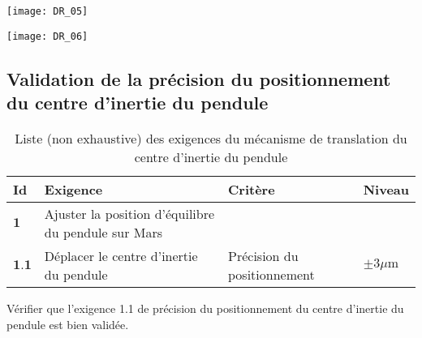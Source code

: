 \ifprof
\else
\begin{minipage}{.48\linewidth}
\begin{center}
\centering
\texttt{[image: DR\_05]}
\end{center}

\end{minipage}
\begin{minipage}{.48\linewidth}
\begin{center}
\centering
\texttt{[image: DR\_06]}
\end{center}
\end{minipage}
\subsection{Validation de la précision du positionnement du centre d'inertie du pendule}

\begin{table}[!h]
\centering
\begin{tabular}{llll}
\hline
Id & Exigence & Critère & Niveau \\
\hline
$\mathbf{1}$ & Ajuster la position d'équilibre du pendule sur Mars &  &  \\
\hline
$\mathbf{1 . 1}$ & Déplacer le centre d'inertie du pendule & Précision du positionnement & $\pm 3 \mu \mathrm{m}$ \\
\hline
\end{tabular}
\caption{\label{ccmp2023_tab_01} Liste (non exhaustive) des exigences du mécanisme de translation du centre d'inertie du pendule}
\end{table}

\begin{obj}
Vérifier que l'exigence 1.1 de précision du positionnement du centre d'inertie du pendule est bien validée.
\end{obj}

